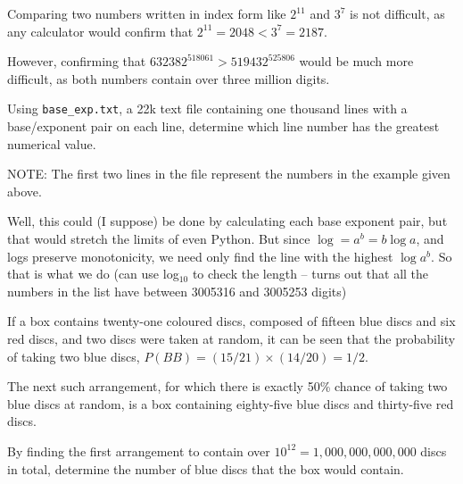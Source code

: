 


Comparing two numbers written in index form like $2^{11}$ and $3^7$ is not difficult, as any calculator would confirm that $2^{11} = 2048 < 3^{7} = 2187$.

However, confirming that $632382^{518061} > 519432^{525806}$ would be much more difficult, as both numbers contain over three million digits.

Using \verb"base_exp.txt", a 22k text file containing one thousand lines with a base/exponent pair on each line, determine which line number has the greatest numerical value.

\footnotesize
NOTE: The first two lines in the file represent the numbers in the example given above.
\normalsize

Well, this could (I suppose) be done by calculating each base exponent pair, but that would stretch the limits of even Python.
But since $\log = a^b = b \log a$, and logs preserve monotonicity, we need only find the line with the highest $\log a^b$.  So that is what we do (can use log$_{10}$ to check the length -- turns out that all the numbers in the list have
between 3005316 and 3005253 digits)




If a box contains twenty-one coloured discs, composed of fifteen blue discs and six red discs, and two discs were taken at random, it can be seen that the probability of taking two blue discs, $P(BB) = (15/21)\times(14/20) = 1/2$.

The next such arrangement, for which there is exactly 50\% chance of taking two blue discs at random, is a box containing eighty-five blue discs and thirty-five red discs.

By finding the first arrangement to contain over $10^{12} = 1,000,000,000,000$ discs in total, determine the number of blue discs that the box would contain.


